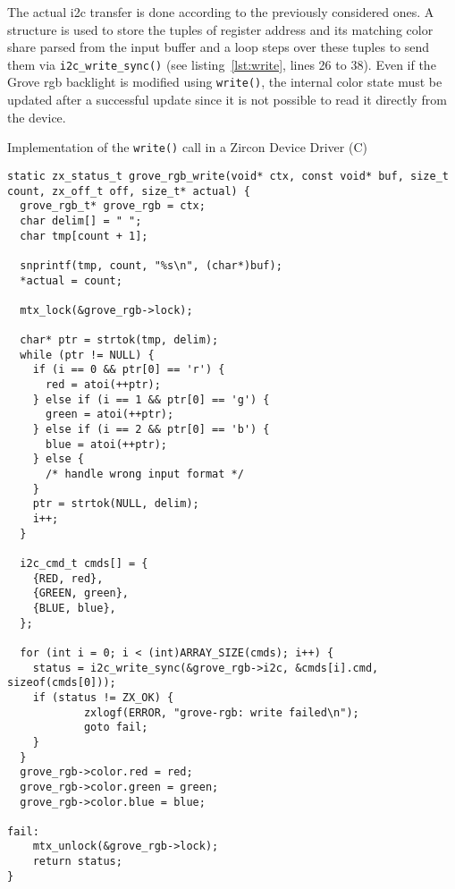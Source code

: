 The actual \ac{i2c} transfer is done according to the previously considered ones.
A structure is used to store the tuples of register address and its matching color share parsed from the input buffer and a loop steps over these tuples to send them via \texttt{i2c_write_sync()} (see listing~\ref{lst:write}, lines 26 to 38).
Even if the Grove \ac{rgb} backlight is modified using \texttt{write()}, the internal color state must be updated after a successful update since it is not possible to read it directly from the device.
%
\begin{listing} [H]
    \caption{Implementation of the \texttt{write()} call in a Zircon Device Driver (C)}
\label{lst:write}
\begin{verbatim}
static zx_status_t grove_rgb_write(void* ctx, const void* buf, size_t count, zx_off_t off, size_t* actual) {
  grove_rgb_t* grove_rgb = ctx;
  char delim[] = " ";
  char tmp[count + 1];
    
  snprintf(tmp, count, "%s\n", (char*)buf);
  *actual = count;

  mtx_lock(&grove_rgb->lock);

  char* ptr = strtok(tmp, delim);
  while (ptr != NULL) {
    if (i == 0 && ptr[0] == 'r') {
      red = atoi(++ptr);
    } else if (i == 1 && ptr[0] == 'g') {
      green = atoi(++ptr);
    } else if (i == 2 && ptr[0] == 'b') {
      blue = atoi(++ptr);
    } else {
      /* handle wrong input format */
    }
    ptr = strtok(NULL, delim);
    i++;
  }

  i2c_cmd_t cmds[] = {
    {RED, red},
    {GREEN, green},
    {BLUE, blue},
  };

  for (int i = 0; i < (int)ARRAY_SIZE(cmds); i++) {
    status = i2c_write_sync(&grove_rgb->i2c, &cmds[i].cmd, sizeof(cmds[0]));
    if (status != ZX_OK) {
            zxlogf(ERROR, "grove-rgb: write failed\n");
            goto fail;
    }
  }
  grove_rgb->color.red = red;
  grove_rgb->color.green = green;
  grove_rgb->color.blue = blue;

fail:
    mtx_unlock(&grove_rgb->lock);
    return status;
}
\end{verbatim}
\end{listing}
%
